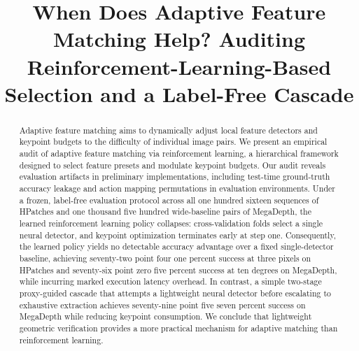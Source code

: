 \documentclass[conference]{IEEEtran}
\begin{document}
\title{When Does Adaptive Feature Matching Help? Auditing Reinforcement-Learning-Based Selection and a Label-Free Cascade}

\author{
\and
{}
\and
{}
}

\maketitle

\begin{abstract}
Adaptive feature matching aims to dynamically adjust local feature detectors and keypoint budgets to the difficulty of individual image pairs. We present an empirical audit of adaptive feature matching via reinforcement learning, a hierarchical framework designed to select feature presets and modulate keypoint budgets. Our audit reveals evaluation artifacts in preliminary implementations, including test-time ground-truth accuracy leakage and action mapping permutations in evaluation environments. Under a frozen, label-free evaluation protocol across all one hundred sixteen sequences of HPatches and one thousand five hundred wide-baseline pairs of MegaDepth, the learned reinforcement learning policy collapses: cross-validation folds select a single neural detector, and keypoint optimization terminates early at step one. Consequently, the learned policy yields no detectable accuracy advantage over a fixed single-detector baseline, achieving seventy-two point four one percent success at three pixels on HPatches and seventy-six point zero five percent success at ten degrees on MegaDepth, while incurring marked execution latency overhead. In contrast, a simple two-stage proxy-guided cascade that attempts a lightweight neural detector before escalating to exhaustive extraction achieves seventy-nine point five seven percent success on MegaDepth while reducing keypoint consumption. We conclude that lightweight geometric verification provides a more practical mechanism for adaptive matching than reinforcement learning.
\end{abstract}
\end{document}
